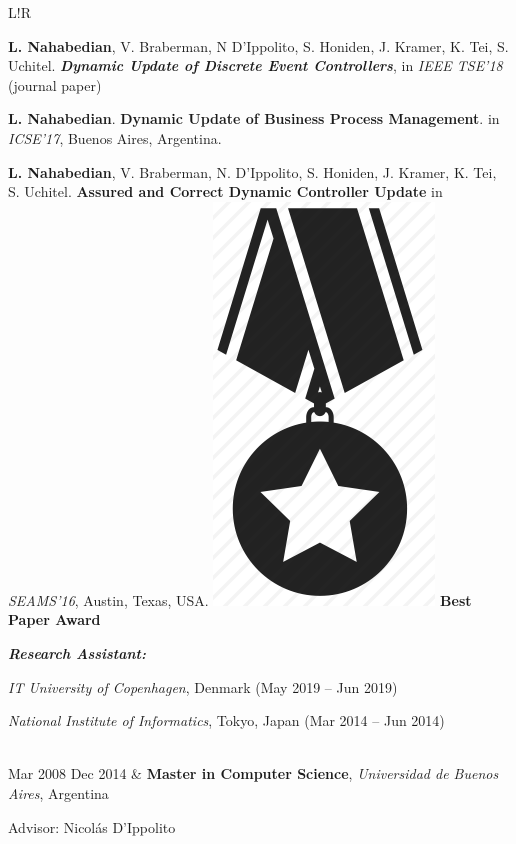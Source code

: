 \documentclass[10pt]{article}
\newcommand\VRule{\color{lightgray}\vrule width 0.5pt}
\begin{document}
\begin{tabular}{L!{\VRule}R}
\begin{compactitem}
	\item \textbf{L. Nahabedian}, V. Braberman, N D'Ippolito, S. Honiden, 
	J. 
	Kramer, K. Tei, 
	S. Uchitel.
	\textbf{\textit{Dynamic Update of Discrete Event Controllers}}, in 
	\textit{IEEE TSE'18} (journal paper)
	\item \textbf{L. Nahabedian}. \textbf{Dynamic Update of Business 
	Process
		Management}. in \textit{ICSE'17}, Buenos Aires, Argentina.
	\item \textbf{L. Nahabedian}, V. Braberman, N. D'Ippolito, S. Honiden, 
	J. Kramer, K. Tei, S. Uchitel. \textbf{Assured and Correct
		Dynamic Controller Update} in \textit{SEAMS'16}, Austin, Texas, 
		USA. 
		\includegraphics[scale=0.022]{../img/medal.png}
	\textbf{Best Paper Award}
	\end{compactitem}
	\textit{\textbf{Research Assistant:}}
	\begin{compactitem}
\item \textit{IT University of 	Copenhagen}, Denmark (May 2019 -- Jun 2019)
\item \textit{National Institute of Informatics}, Tokyo, Japan (Mar 2014 -- Jun 
2014)
	\end{compactitem}
	\\
	Mar 2008 Dec 2014 & \textbf{Master in Computer Science}, 
	\textit{Universidad de Buenos Aires}, Argentina
	
	Advisor: Nicol\'as D'Ippolito \\
\end{tabular}
\end{document}
